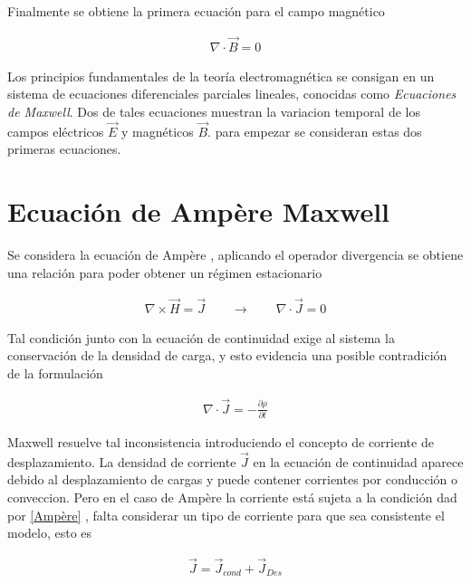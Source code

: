 Finalmente se obtiene la primera ecuación para el campo magnético 

\begin{eqnarray}
    \label{divceroB}
    \boxed{\nabla \cdot \vec{B} = 0}
\end{eqnarray}

\noindent Los principios fundamentales de la teoría electromagnética se consigan en un sistema de ecuaciones diferenciales parciales lineales, conocidas como \emph{Ecuaciones de Maxwell}. Dos de tales ecuaciones muestran la variacion temporal de los campos eléctricos $\vec{E}$ y magnéticos $\vec{B}$. para empezar se consideran estas dos primeras ecuaciones.\\



\section{Ecuación de Ampère Maxwell}

Se considera la ecuación de Ampère \cite{Jackson} , aplicando el operador divergencia se obtiene una relación para poder obtener un régimen estacionario



\begin{eqnarray}
    \label{Ampère}
    \nabla \times \vec{H} = \vec{J} \qquad  \longrightarrow  \qquad 
    \nabla \cdot \vec{J} = 0 
\end{eqnarray}

Tal condición junto con la ecuación de continuidad exige al sistema la conservación de la densidad de carga, y esto evidencia una posible contradición de la formulación

\begin{eqnarray}
    \nabla \cdot \vec{J} = -\frac{\partial \rho}{\partial t}
\end{eqnarray}

Maxwell resuelve tal inconsistencia introduciendo el concepto de corriente de desplazamiento. La densidad de corriente $\vec{J}$ en la ecuación de continuidad aparece debido al desplazamiento de cargas y puede contener corrientes por conducción o conveccion. Pero en el caso de Ampère la corriente está sujeta a la condición dad por  \eqref{Ampère} , falta considerar un tipo de corriente para que sea consistente el modelo, esto es

\begin{eqnarray}
    \vec{J} = \vec{J}_{cond} + \vec{J}_{Des}
\end{eqnarray}

